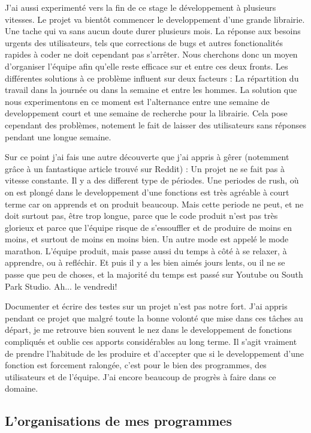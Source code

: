 J'ai aussi experimenté vers la fin de ce stage le développement à plusieurs vitesses. Le projet va bientôt commencer le developpement d'une grande librairie. Une tache qui va sans aucun doute durer plusieurs mois. La réponse aux besoins urgents des utilisateurs, tels que corrections de bugs et autres fonctionalités rapides à coder ne doit cependant pas s'arrêter. Nous cherchons donc un moyen d'organiser l'équipe afin qu'elle reste efficace sur et entre ces deux fronts. Les différentes solutions à ce problème influent sur deux facteurs : La répartition du travail dans la journée ou dans la semaine et entre les hommes. La solution que nous experimentons en ce moment est l'alternance entre une semaine de developpement court et une semaine de recherche pour la librairie. Cela pose cependant des problèmes, notement le fait de laisser des utilisateurs sans réponses pendant une longue semaine.

Sur ce point j'ai fais une autre découverte que j'ai appris à gêrer (notemment grâce à un fantastique article trouvé sur Reddit) %
: Un projet ne se fait pas à vitesse constante. Il y a des different type de périodes. Une periodes de rush, où on est plongé dans le developpement d'une fonctions est très agréable à court terme car on apprends et on produit beaucoup. Mais cette periode ne peut, et ne doit surtout pas, être trop longue, parce que le code produit n'est pas très glorieux et parce que l'équipe risque de s'essouffler et de produire de moins en moins, et surtout de moins en moins bien. Un autre mode est appelé le mode marathon. L'équipe produit, mais passe aussi du temps à côté à se relaxer, à apprendre, ou à refléchir. Et puis il y a les bien aimés jours lents, ou il ne se passe que peu de choses, et la majorité du temps est passé sur Youtube ou South Park Studio. Ah... le vendredi!

Documenter et écrire des testes sur un projet n'est pas notre fort. J'ai appris pendant ce projet que malgré toute la bonne volonté que mise dans ces tâches au départ, je me retrouve bien souvent le nez dans le developpement de fonctions compliqués et oublie ces apports considérables au long terme. Il s'agit vraiment de prendre l'habitude de les produire et d'accepter que si le developpement d'une fonction est forcement ralongée, c'est pour le bien des programmes, des utilisateurs et de l'équipe. J'ai encore beaucoup de progrès à faire dans ce domaine.

\subsection{L'organisations de mes programmes}

